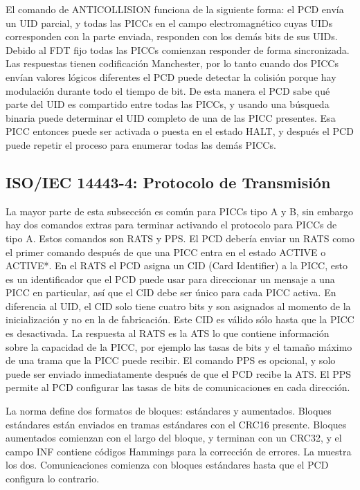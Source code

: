 \documentclass[a4paper, twoside, 11pt]{report}
\begin{document}
El comando de ANTICOLLISION funciona de la siguiente forma: el PCD envía un UID parcial, y todas las PICCs en el campo electromagnético cuyas UIDs corresponden con la parte enviada, responden con los demás bits de sus UIDs. Debido al FDT fijo todas las PICCs comienzan responder de forma sincronizada. Las respuestas tienen codificación Manchester, por lo tanto cuando dos PICCs envían valores lógicos diferentes el PCD puede detectar la colisión porque hay modulación durante todo el tiempo de bit. De esta manera el PCD sabe qué parte del UID es compartido entre todas las PICCs, y usando una búsqueda binaria puede determinar el UID completo de una de las PICC presentes. Esa PICC entonces puede ser activada o puesta en el estado HALT, y después el PCD puede repetir el proceso para enumerar todas las demás PICCs.

\FloatBarrier
\subsection{ISO/IEC 14443-4: \large{Protocolo de Transmisión}}

La mayor parte de esta subsección es común para PICCs tipo A y B, sin embargo hay dos comandos extras para terminar activando el protocolo para PICCs de tipo A. Estos comandos son RATS y PPS. El PCD debería enviar un RATS como el primer comando después de que una PICC entra en el estado ACTIVE o ACTIVE*. En el RATS el PCD asigna un CID (Card Identifier) a la PICC, esto es un identificador que el PCD puede usar para direccionar un mensaje a una PICC en particular, así que el CID debe ser único para cada PICC activa. En diferencia al UID, el CID solo tiene cuatro bits y son asignados  al momento de la inicialización y no en la  de fabricación. Este CID es válido sólo hasta que la PICC es desactivada. La respuesta al RATS es la ATS lo que contiene información sobre la capacidad de la PICC, por ejemplo las tasas de bits y el tamaño máximo de una trama que la PICC puede recibir. El comando PPS es opcional, y solo puede ser enviado inmediatamente después de que el PCD recibe la ATS. El PPS permite al PCD configurar las tasas de bits de comunicaciones en cada dirección.

La norma define dos formatos de bloques: estándares y aumentados. Bloques estándares están enviados en tramas estándares con el CRC16 presente. Bloques aumentados comienzan con el largo del bloque, y terminan con un CRC32, y el campo INF contiene códigos Hammings para la corrección de errores. La  muestra los dos. Comunicaciones comienza con bloques estándares hasta que el PCD configura lo contrario.
\end{document}

